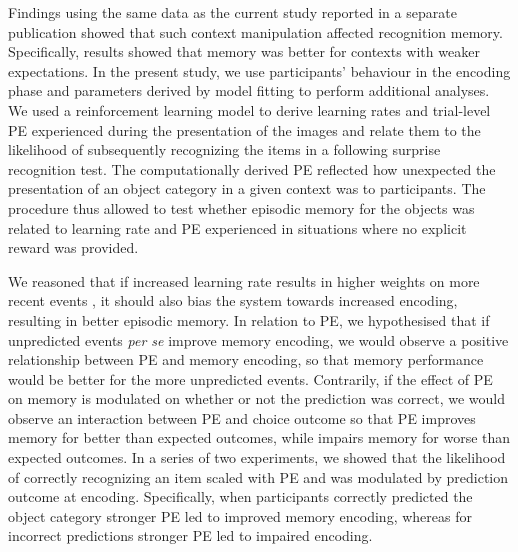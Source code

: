 \documentclass[a4paper,12pt]{article}
\begin{document}
Findings using the same data as the current study reported in a separate publication \citep{ortiz2021not} showed that such context manipulation affected recognition memory. Specifically, results showed that memory was better for contexts with weaker expectations. In the present study, we use participants' behaviour in the encoding phase and parameters derived by model fitting to perform additional analyses. We used a reinforcement learning model to derive learning rates and trial-level PE experienced during the presentation of the images and relate them to the likelihood of subsequently recognizing the items in a following surprise recognition test. The computationally derived PE reflected how unexpected the presentation of an object category in a given context was to participants. The procedure thus allowed to test whether episodic memory for the objects was related to learning rate and PE experienced in situations where no explicit reward was provided.
\par
 We reasoned that if increased learning rate results in higher weights on more recent events \citep{Daw2013}, it should also bias the system towards increased encoding, resulting in better episodic memory. In relation to PE, we hypothesised that if unpredicted events \textit{per se} improve memory encoding, we would observe a positive relationship between PE and memory encoding, so that memory performance would be better for the more unpredicted events. Contrarily, if the effect of PE on memory is modulated on whether or not the prediction was correct, we would observe an interaction between PE and choice outcome so that PE improves memory for better than expected outcomes, while impairs memory for worse than expected outcomes. In a series of two experiments, we showed that the likelihood of correctly recognizing an item scaled with PE and was modulated by prediction outcome at encoding. Specifically, when participants correctly predicted the object category stronger PE led to improved memory encoding, whereas for incorrect predictions stronger PE led to impaired encoding. %
\end{document}

